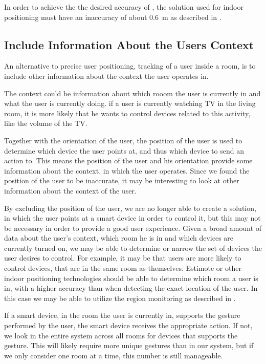 In order to achieve the the desired accuracy of ,
the solution used for indoor positioning must have an inaccuracy of about \SI{0.6}{\meter}
as described in .

\subsection{Include Information About the Users Context}

An alternative to precise user positioning, 
\ie tracking of a user inside a room, 
is to include other information about the context the user operates in.

The context could be information about which rooom the user is currently in and what the user is currently doing. \eg if a user is currently watching TV in the living room, it is more likely that he wants to control devices related to this activity, like the volume of the TV.

Together with the orientation of the user, 
the position of the user is used to determine which device the user points at, 
and thus which device to send an action to. 
This means the position of the user and his orientation provide some information about the context, 
in which the user operates. 
Since we found the position of the user to be inaccurate, 
it may be interesting to look at other information about the context of the user.

By excluding the position of the user, 
we are no longer able to create a solution, 
in which the user points at a smart device in order to control it, 
but this may not be necessary in order to provide a good user experience. 
Given a broad amount of data about the user's context, 
\eg which room he is in and which devices are currently turned on, 
we may be able to determine or narrow the set of devices the user desires to control. 
For example, it may be that users are more likely to control devices, 
that are in the same room as themselves. 
Estimote or other indoor positioning technologies should be able to determine which room a user is in, 
with a higher accuracy than when detecting the exact location of the user.
In this case we may be able to utilize the region monitoring as described in .

If a smart device, in the room the user is currently in, 
supports the gesture performed by the user, 
the smart device receives the appropriate action. 
If not, we look in the entire system across all rooms for devices that supports the gesture.
This will likely require more unique gestures than in our system,
but if we only consider one room at a time, 
this number is still manageable.

